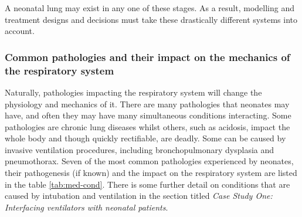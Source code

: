 \documentclass[12pt, openany, oneside]{book}
\begin{document}
A neonatal lung may exist in any one of these stages. As a result, modelling and treatment designs and decisions must take these drastically different systems into account.



\subsubsection{Common pathologies and their impact on the mechanics of the respiratory system}
Naturally, pathologies impacting the respiratory system will change the physiology and mechanics of it. There are many pathologies that neonates may have, and often they may have many simultaneous conditions interacting. Some pathologies are chronic lung diseases whilst others, such as acidosis, impact the whole body and though quickly rectifiable, are deadly. Some can be caused by invasive ventilation procedures, including bronchopulmonary dysplasia and pneumothorax. Seven of the most common pathologies experienced by neonates, their pathogenesis (if known) and the impact on the respiratory system are listed in the table \ref{tab:med-cond}. There is some further detail on conditions that are caused by intubation and ventilation in the section titled \textit{Case Study One: Interfacing ventilators with neonatal patients}.
\end{document}
